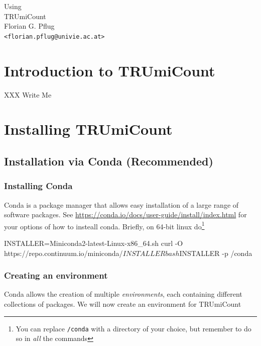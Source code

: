 \documentclass[10pt]{article}
\begin{document}
\begin{titlepage}
\vfill
{\Huge\centering%
Using\\
TRUmiCount\\}
\vskip5cm
{\large\centering%
Florian G. Pflug\\
\texttt{<florian.pflug@univie.ac.at>}\\}
\vfill
\tableofcontents
\vfill
\end{titlepage}

\section{Introduction to TRUmiCount}

XXX Write Me

\newpage
\section{Installing TRUmiCount}

\subsection{Installation via Conda (Recommended)}

\subsubsection*{Installing Conda}

Conda is a package manager that allows easy installation of a large range of software packages. See \url{https://conda.io/docs/user-guide/install/index.html} for your options of how to insteall conda. Briefly, on 64-bit linux do\footnote{You can replace \texttt{/conda} with a directory of your choice, but remember to do so in \emph{all} the commands}

\begin{shellcode}
INSTALLER=Miniconda2-latest-Linux-x86_64.sh
curl -O https://repo.continuum.io/miniconda/$INSTALLER
bash $INSTALLER -p /conda
\end{shellcode}

\subsubsection*{Creating an environment}

Conda allows the creation of multiple \emph{environments}, each containing different collections of packages. We will now create an environment for TRUmiCount
\end{document}
